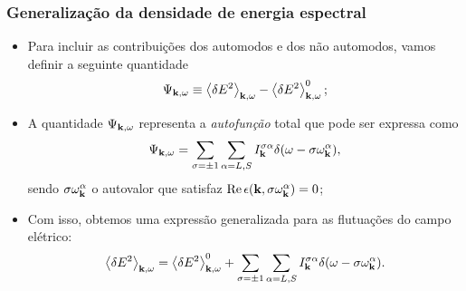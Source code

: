 \documentclass[10pt,aspectratio=1610,lualatex]{beamer}
\begin{document}
\begin{frame}
  \frametitle{Generalização da densidade de energia espectral}
  \begin{itemize}
    \item Para incluir as contribuições dos automodos e dos não
    automodos, vamos definir a seguinte quantidade
    \begin{displaymath}
      \Psi_{{\bf k},\omega}\equiv\left< \delta E^2 \right>_{{\bf k},\omega}
      -\left< \delta E^2 \right>_{{\bf k},\omega}^0;
    \end{displaymath}
    \vspace{-0.4cm}
    \pause
    \item A quantidade $\Psi_{{\bf k},\omega}$ representa a
    \emph{autofunção} total que %
    pode ser expressa como
    \begin{displaymath}
      \Psi_{{\bf k},\omega}=\sum_{\sigma=\pm 1}\sum_{\alpha=L,S}
      I_{\bf k}^{\sigma \alpha}\delta(\omega-\sigma \omega_{\bf k}^\alpha),
    \end{displaymath}
    sendo $\sigma \omega_{\bf k}^\alpha$ o autovalor que satisfaz
    $\mbox{Re}\, \epsilon({\bf k},\sigma\omega_{\bf k}^\alpha)=0$;
    \vspace{0.25cm}
    \pause
    \item Com isso, obtemos uma expressão generalizada para as
    flutuações do campo elétrico:
    \begin{equation}
      \label{gen-dens}
      \left< \delta E^2 \right>_{{\bf k},\omega}
      =\left< \delta E^2 \right>_{{\bf k},\omega}^0
      +\sum_{\sigma=\pm 1}\sum_{\alpha=L,S}
      I_{\bf k}^{\sigma \alpha}
      \delta(\omega-\sigma \omega_{\bf k}^\alpha).
    \end{equation} 
  \end{itemize}
\end{frame}
\end{document}
